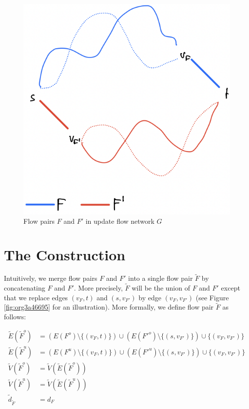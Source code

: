 \documentclass[fontsize=11pt,paper=a4]{book}
\begin{document}
\begin{figure}[htbp]
\centering
\includegraphics[width=.9\linewidth]{../assets/Screen Shot 2023-02-19 at 13.28.41.png}
\caption{\label{fig:org0d4c1a4}Flow pairs \(F\) and \(F'\) in update flow network \(G\)}
\end{figure}

\section{The Construction}
\label{sec:orgf828cfb}

Intuitively, we merge flow pairs \(F\) and \(F'\) into a single flow pair \(\tilde{F}\) by concatenating \(F\) and \(F'\).
More precisely, \(\tilde{F}\) will be the union of \(F\) and \(F'\) except that we replace edges \((v_F,t)\) and \((s,v_{F'})\) by edge \((v_F,v_{F'})\) (see Figure \ref{fig:org3a46695} for an illustration).
More formally, we define flow pair \(\tilde{F}\) as follows:

\begin{align*}
\tilde{E}(\tilde{F}^o)&=\left(E(F^o)\setminus\{(v_F,t)\}\right)\cup\left(E(F'^o)\setminus\{(s,v_{F'})\}\right)\cup\{(v_F,v_{F'})\}\\
\tilde{E}(\tilde{F}^u)&=\left(E(F^u)\setminus\{(v_F,t)\}\right)\cup\left(E(F'^u)\setminus\{(s,v_{F'})\}\right)\cup\{(v_F,v_{F'})\}\\
\tilde{V}(\tilde{F}^o)&=\tilde{V}(\tilde{E}(\tilde{F}^o))\\
\tilde{V}(\tilde{F}^u)&=\tilde{V}(\tilde{E}(\tilde{F}^u))\\
\tilde{d}_{\tilde{F}}&=d_F
\end{align*}
\end{document}
